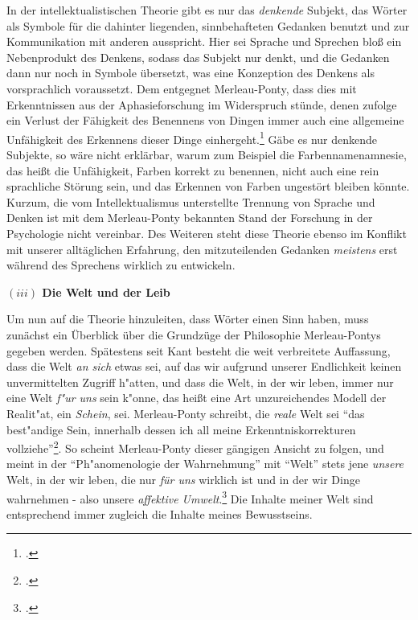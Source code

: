 \documentclass[a4paper, 12pt]{article}
\begin{document}
\begin{onehalfspace}
In der intellektualistischen Theorie gibt es nur das \emph{denkende} Subjekt, das Wörter als Symbole für die dahinter liegenden, sinnbehafteten Gedanken benutzt und zur Kommunikation mit anderen ausspricht. Hier sei Sprache und Sprechen bloß ein Nebenprodukt des Denkens, sodass das Subjekt nur denkt, und die Gedanken dann nur noch in Symbole übersetzt, was eine Konzeption des Denkens als vorsprachlich voraussetzt. Dem entgegnet Merleau-Ponty, dass dies mit Erkenntnissen aus der Aphasieforschung im Widerspruch stünde, denen zufolge ein Verlust der Fähigkeit des Benennens von Dingen immer auch eine allgemeine Unfähigkeit des Erkennens dieser Dinge einhergeht.\footnote{\Cite[Vgl.][S. 208 f.]{merleau1966phanomenologie}.} Gäbe es nur denkende Subjekte, so wäre nicht erklärbar, warum zum Beispiel die Farbennamenamnesie, das heißt die Unfähigkeit, Farben korrekt zu benennen, nicht auch eine rein sprachliche Störung sein, und das Erkennen von Farben ungestört bleiben könnte. Kurzum, die vom Intellektualismus unterstellte Trennung von Sprache und Denken ist mit dem Merleau-Ponty bekannten Stand der Forschung in der Psychologie nicht vereinbar. Des Weiteren steht diese Theorie ebenso im Konflikt mit unserer alltäglichen Erfahrung, den mitzuteilenden Gedanken \emph{meistens} erst während des Sprechens wirklich zu entwickeln. 

\vspace{5mm}

\noindent\textbf{$(iii)$ Die Welt und der Leib}

\noindent Um nun auf die Theorie hinzuleiten, dass Wörter einen Sinn haben, muss zunächst ein Überblick über die Grundzüge der Philosophie Merleau-Pontys gegeben werden. Spätestens seit Kant besteht die weit verbreitete Auffassung, dass die Welt \emph{an sich} etwas sei, auf das wir aufgrund unserer Endlichkeit keinen unvermittelten Zugriff h"atten, und dass die Welt, in der wir leben, immer nur eine Welt \emph{f"ur uns} sein k"onne, das heißt eine Art unzureichendes Modell der Realit"at, ein \emph{Schein}, sei. Merleau-Ponty schreibt, die \emph{reale} Welt sei "`das best"andige Sein, innerhalb dessen ich all meine Erkenntniskorrekturen vollziehe"'\footnote{\Cite[Siehe][S. 379]{merleau1966phanomenologie}.}. So scheint Merleau-Ponty dieser gängigen Ansicht zu folgen, und meint in der "`Ph"anomenologie der Wahrnehmung"' mit "`Welt"' stets jene \emph{unsere} Welt, in der wir leben, die nur \emph{für uns} wirklich ist und in der wir Dinge wahrnehmen - also unsere \emph{affektive Umwelt}.\footnote{\Cite[Vgl.][S. 185]{merleau1966phanomenologie}.} Die Inhalte meiner Welt sind entsprechend immer zugleich die Inhalte meines Bewusstseins.


\end{onehalfspace}
\end{document}
